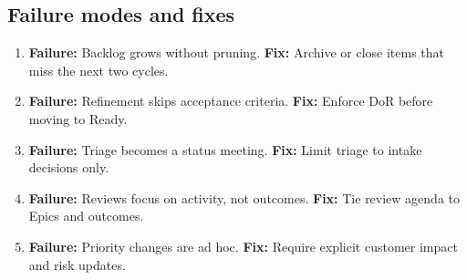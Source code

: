 \subsection{Failure modes and fixes}
\begin{enumerate}
  \item \textbf{Failure:} Backlog grows without pruning. \textbf{Fix:} Archive or close items that miss the next two cycles.
  \item \textbf{Failure:} Refinement skips acceptance criteria. \textbf{Fix:} Enforce DoR before moving to Ready.
  \item \textbf{Failure:} Triage becomes a status meeting. \textbf{Fix:} Limit triage to intake decisions only.
  \item \textbf{Failure:} Reviews focus on activity, not outcomes. \textbf{Fix:} Tie review agenda to Epics and outcomes.
  \item \textbf{Failure:} Priority changes are ad hoc. \textbf{Fix:} Require explicit customer impact and risk updates.
\end{enumerate}










